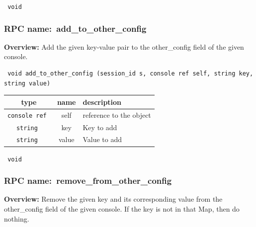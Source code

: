 \vspace{0.3cm}

{\tt 
void
}



\vspace{0.3cm}
\vspace{0.3cm}
\vspace{0.3cm}
\subsubsection{RPC name:~add\_to\_other\_config}

{\bf Overview:} 
Add the given key-value pair to the other\_config field of the given
console.

\begin{verbatim} void add_to_other_config (session_id s, console ref self, string key, string value)\end{verbatim}



 
\vspace{0.3cm}
\begin{tabular}{|c|c|p{7cm}|}
 \hline
{\bf type} & {\bf name} & {\bf description} \\ \hline
{\tt console ref } & self & reference to the object \\ \hline 

{\tt string } & key & Key to add \\ \hline 

{\tt string } & value & Value to add \\ \hline 

\end{tabular}

\vspace{0.3cm}

{\tt 
void
}



\vspace{0.3cm}
\vspace{0.3cm}
\vspace{0.3cm}
\subsubsection{RPC name:~remove\_from\_other\_config}

{\bf Overview:} 
Remove the given key and its corresponding value from the other\_config
field of the given console.  If the key is not in that Map, then do
nothing.

